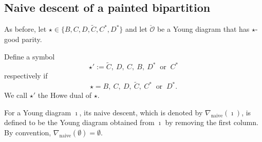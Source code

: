 \documentclass[12pt]{amsart}
\newcommand{\CO}{{\mathcal {O}}}
\def\eDD{\mathrm{d}^{e}}
\numberwithin{equation}{section}
\theoremstyle{remark}
\def\PBP{\mathsf{PBP}}
\def\PPm{\wp_{\downarrow}}
\def\uptaum{\uptau_{\downarrow}}
\def\eDD{\mathrm{d}^{e}}
\begin{document}




\subsection{Naive descent of a painted bipartition}\label{sec:comb}


As before, let  $\star\in \{ B, C,  D, \widetilde{C},  C^*, D^*\}$ and let $\check \CO$ be a Young diagram that has $\star$-good parity.


Define a symbol
\[
\star':=\widetilde{C}, \ D, \  C, \ B, \ D^*\  \textrm{ or } \ C^*
\]
respectively if
\[
\star=B,\  C, \ D, \ \widetilde{C}, \ C^* \ \textrm{ or }\  D^*.
\]
We call $\star'$
 the Howe dual of $\star$.




\def\bipartl{\mathrm{bi\cP_L}}
\def\bipartr{\mathrm{bi\cP_R}}
\def\dsdiagl{\mathrm{DS_L}}
\def\dsdiagr{\mathrm{DS_R}}
\def\DDl{\eDD_\mathrm{L}}
\def\DDr{\eDD_\mathrm{R}}


For a Young diagram $\imath$, its naive descent, which is denoted by $\nabla_\mathrm{naive}(\imath)$, is defined to be the Young diagram obtained from $\imath$ by removing the first column. By convention, $\nabla_\mathrm{naive}(\emptyset)=\emptyset$.
\end{document}

